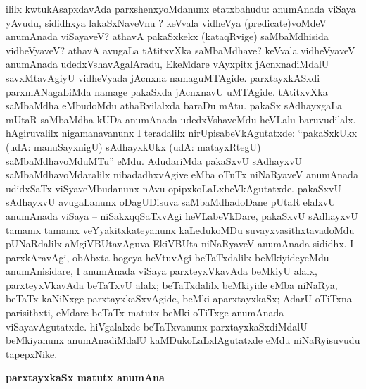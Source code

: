 ililx kwtukAsapxdavAda parxshenxyoMdanunx etatxbahudu: anumAnada viSaya yAvudu, sididhxya lakaSxNaveVnu ? keVvala vidheVya {\rm(predicate)}voMdeV anumAnada viSayaveV? athavA pakaSxkekx (kataqRvige) saMbaMdhisida vidheVyaveV? athavA avugaLa tAtitxvXka saMbaMdhave? keVvala vidheVyaveV anumAnada udedxVshavAgalAradu, EkeMdare vAyxpitx jAcnxnadiMdalU savxMtavAgiyU vidheVyada jAcnxna namaguMTAgide. parxtayxkASxdi parxmANagaLiMda namage pakaSxda jAcnxnavU uMTAgide. tAtitxvXka saMbaMdha eMbudoMdu athaRvilalxda baraDu mAtu. pakaSx sAdhayxgaLa mUtaR saMbaMdha kUDa anumAnada udedxVshaveMdu heVLalu baruvudilalx. hAgiruvalilx nigamanavanunx I teradalilx nirUpisabeVkAgutatxde: ``pakaSxkUkx (udA: manuSayxnigU) sAdhayxkUkx (udA: matayxRtegU) saMbaMdhavoMduMTu'' eMdu. AdudariMda pakaSxvU sAdhayxvU saMbaMdhavoMdaralilx nibadadhxvAgive eMba oTuTx niNaRyaveV anumAnada udidxSaTx viSyaveMbudanunx nAvu opipxkoLaLxbeVkAgutatxde. pakaSxvU sAdhayxvU avugaLanunx oDagUDisuva saMbaMdhadoDane pUtaR elalxvU anumAnada viSaya -- niSakxqqSaTxvAgi heVLabeVkDare, pakaSxvU sAdhayxvU tamamx tamamx veYyakitxkateyanunx kaLedukoMDu suvayxvasithxtavadoMdu pUNaRdalilx aMgiVBUtavAguva EkiVBUta niNaRyaveV anumAnada sididhx. I parxkAravAgi, obAbxta hogeya heVtuvAgi beTaTxdalilx beMkiyideyeMdu anumAnisidare, I anumAnada viSaya parxteyxVkavAda beMkiyU alalx, parxteyxVkavAda beTaTxvU alalx; beTaTxdalilx beMkiyide eMba niNaRya, beTaTx kaNiNxge parxtayxkaSxvAgide, beMki aparxtayxkaSx; AdarU oTiTxna parisithxti, eMdare beTaTx matutx beMki oTiTxge anumAnada viSayavAgutatxde. hiVgalalxde beTaTxvanunx parxtayxkaSxdiMdalU beMkiyanunx anumAnadiMdalU kaMDukoLaLxlAgutatxde eMdu niNaRyisuvudu tapepxNike.

\bigskip
\begin{center}
{\Large\bf parxtayxkaSx matutx anumAna}
\end{center}

